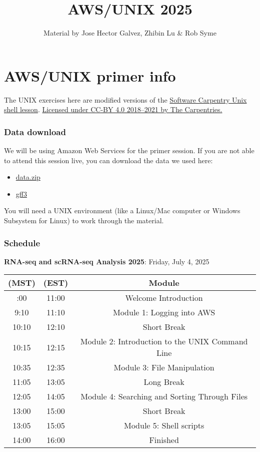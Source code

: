 \documentclass[
]{book}
\title{AWS/UNIX 2025}
\author{Material by Jose Hector Galvez, Zhibin Lu \& Rob Syme}
\date{}
\providecommand{\tightlist}{%
  \setlength{\itemsep}{0pt}\setlength{\parskip}{0pt}}
\begin{document}
\maketitle

{
\setcounter{tocdepth}{1}
\tableofcontents
}
\chapter{AWS/UNIX primer info}\label{awsunix-primer-info}

The UNIX exercises here are modified versions of the \href{https://swcarpentry.github.io/shell-novice/}{Software Carpentry Unix shell lesson}. \href{https://carpentries.org/}{Licensed under CC-BY 4.0 2018--2021 by The Carpentries.}

\subsection{Data download}\label{data-download}

We will be using Amazon Web Services for the primer session. If you are not able to attend this session live, you can download the data we used here:

\begin{itemize}
\tightlist
\item
  \href{https://drive.google.com/file/d/1Rckn6rUl9Tv1XnUcG7MvcAztqhqqCIs-/view?usp=drive_link}{data.zip}
\item
  \href{https://drive.google.com/file/d/1GX4LZlIkXiRQqOZD6Tq30eErSZ3Dgd6n/view?usp=drive_link}{gff3}
\end{itemize}

You will need a UNIX environment (like a Linux/Mac computer or Windows Subsystem for Linux) to work through the material.

\subsection{Schedule}\label{schedule}

\textbf{RNA-seq and scRNA-seq Analysis 2025}: Friday, July 4, 2025

\begin{longtable}[]{@{}ccc@{}}
\toprule\noalign{}
(MST) & (EST) & Module \\
\midrule\noalign{}
\endhead
\bottomrule\noalign{}
\endlastfoot
9:00 & 11:00 & Welcome Introduction \\
9:10 & 11:10 & Module 1: Logging into AWS \\
10:10 & 12:10 & Short Break \\
10:15 & 12:15 & Module 2: Introduction to the UNIX Command Line \\
10:35 & 12:35 & Module 3: File Manipulation \\
11:05 & 13:05 & Long Break \\
12:05 & 14:05 & Module 4: Searching and Sorting Through Files \\
13:00 & 15:00 & Short Break \\
13:05 & 15:05 & Module 5: Shell scripts \\
14:00 & 16:00 & Finished \\
\end{longtable}
\end{document}
